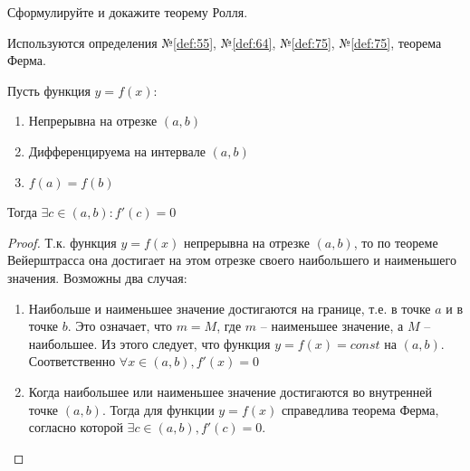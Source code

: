\begin{question}
    Сформулируйте и докажите теорему Ролля.
\end{question}
\begin{used}
    Используются определения №\ref{def:55}, №\ref{def:64}, №\ref{def:75}, №\ref{def:75}, теорема Ферма.
\end{used}
\begin{theorem}
    Пусть функция $y = f(x)$:
     \begin{enumerate}
      \item Непрерывна на отрезке $(a, b)$ 
      \item Дифференцируема на интервале  $(a, b)$
      \item $f(a) = f(b)$
    \end{enumerate}
    Тогда $\exists c \in (a, b) : f'(c) = 0$
\end{theorem}
\begin{proof}
    Т.к. функция $y = f(x)$ непрерывна на отрезке $(a,b)$, то по теореме Вейерштрасса она достигает на этом отрезке своего наибольшего и наименьшего значения. Возможны два случая:
    \begin{enumerate}
        \item Наибольше и наименьшее значение достигаются на границе, т.е. в точке $a$ и в точке  $b$. Это означает, что  $m = M$, где  $m$ -- наименьшее значение, а  $M$ -- наибольшее. Из этого следует, что функция  $y = f(x) = const$ на $(a, b)$. Соответственно  $\forall x \in (a, b), f'(x) = 0$
        \item Когда наибольшее или наименьшее значение достигаются во внутренней точке $(a, b)$. Тогда для функции $y = f(x)$ справедлива теорема Ферма, согласно которой $\exists c \in (a, b), f'(c) = 0$.
    \end{enumerate}
\end{proof}
\pagebreak



